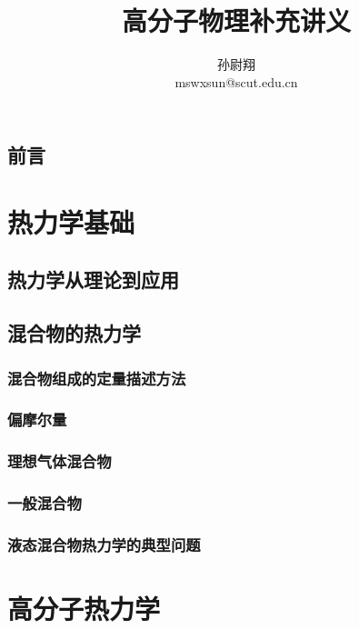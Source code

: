 \documentclass[zihao=5,linespread=1.3,a4paper,heading=true,twoside]{ctexbook}
\title{高分子物理补充讲义}
\author{孙尉翔\\mswxsun@scut.edu.cn}
\theoremstyle{definition}
\theoremstyle{plain}
\begin{document}
\maketitle
\chapter*{前言}\label{sec:preface}


\newpage\tableofcontents

\part{热力学基础}
\chapter{热力学从理论到应用}\label{sec:I_thermodynamic_relations}


\chapter{混合物的热力学}\label{sec:II 混合物的热力学}
\section{混合物组成的定量描述方法}\label{sec:II.1 composition_measures}

\section{偏摩尔量}\label{sec:II.2 partial_molar_quantities}

\section{理想气体混合物}\label{sec:II.3 ideal_mixture.tex}

\section{一般混合物}\label{sec:II.4 real_mixture}

\section{液态混合物热力学的典型问题}\label{sec:II.5 typical_problems}


\part{高分子热力学}
\end{document}
